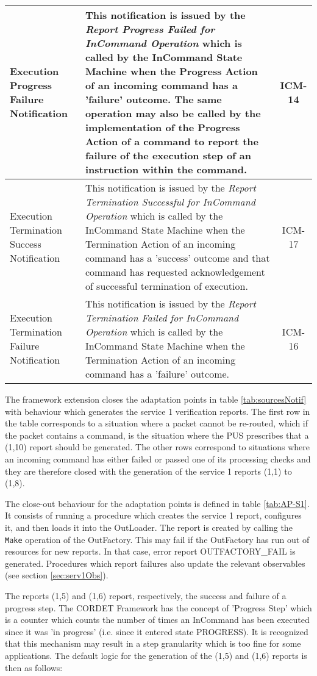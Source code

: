 \documentclass{pnp_article}
\begin{document}
\begin{longtable}{|>{\raggedright\arraybackslash}p{2.1cm}|>{\raggedright\arraybackslash}p{9.8cm}|c|}
\hline
Execution Progress Failure Notification &  This notification is issued by the \textit{Report Progress Failed for InCommand Operation} which is called by the InCommand State Machine when the Progress Action of an incoming command has a 'failure' outcome. The same operation may also be called by the implementation of the Progress Action of a command to report the failure of the execution step of an instruction within the command. & ICM-14 \\
\hline 
Execution Termination Success Notification &  This notification is issued by the  \textit{Report Termination Successful for InCommand Operation} which is called by the InCommand State Machine when the Termination Action of an incoming command has a 'success' outcome and that command has requested acknowledgement of successful termination of execution. & ICM-17 \\
\hline
Execution Termination Failure Notification &  This notification is issued by the \textit{Report Termination Failed for InCommand Operation} which is called by the InCommand State Machine when the Termination Action of an incoming command has a 'failure' outcome. & ICM-16 \\
\hline
\end{longtable} 

The framework extension closes the adaptation points in table \ref{tab:sourcesNotif} with behaviour which generates the service 1 verification reports. The first row in the table corresponds to a situation where a packet cannot be re-routed, which if the packet contains a command, is the situation where the PUS prescribes that a (1,10) report should be generated. The other rows correspond to situations where an incoming command has either failed or passed one of its processing checks and they are therefore closed with the generation of the service 1 reports (1,1) to (1,8). 

The close-out behaviour for the adaptation points is defined in table \ref{tab:AP-S1}. It consists of running a procedure which creates the service 1 report, configures it, and then loads it into the OutLoader. The report is created by calling the \texttt{Make} operation of the OutFactory. This may fail if the OutFactory has run out of resources for new reports. In that case, error report OUTFACTORY\_FAIL is generated. Procedures which report failures also update the relevant observables (see section \ref{sec:serv1Obs}).

The reports (1,5) and (1,6) report, respectively, the success and failure of a progress step. The CORDET Framework has the concept of 'Progress Step' which is a counter which counts the number of times an InCommand has been executed since it was 'in progress' (i.e. since it entered state PROGRESS). It is recognized that this mechanism may result in a step granularity which is too fine for some applications. The default logic for the generation of the (1,5) and (1,6) reports is then as follows:
\end{document}
